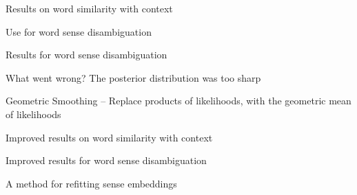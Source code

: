 \documentclass[dvipsnames]{beamer}
\begin{document}
\begin{frame}{Results on word similarity with context}
	
\end{frame}

\begin{frame}{Use for word sense disambiguation }
	
\end{frame}

\begin{frame}{Results for word sense disambiguation}
	
\end{frame}

\begin{frame}{What went wrong? The posterior distribution was too sharp}
	
\end{frame}

\begin{frame}{Geometric Smoothing -- Replace products of likelihoods, with the geometric mean of likelihoods}
	
\end{frame}


\begin{frame}{Improved results on word similarity with context}
	
\end{frame}


\begin{frame}{Improved results  for word sense disambiguation}
	
\end{frame}


\begin{frame}{A method for refitting sense embeddings}
	
\end{frame}

	
\end{document}
